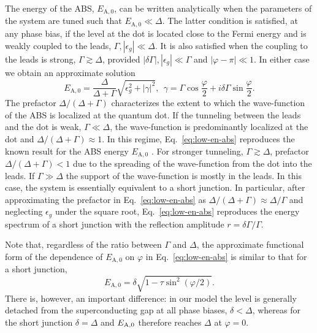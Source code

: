 \documentclass[aps,reprint,longbibliography, prb]{revtex4-2}
\begin{document}
The energy of the ABS, $E_\mathrm{A,0}$, can be written analytically when the parameters of the system are tuned such that $E_{\mathrm{A,0}}\ll \Delta$. The latter condition is satisfied, at any phase bias, if the level at the dot is located close to the Fermi energy and is weakly coupled to the leads, $\Gamma, |\epsilon_g| \ll \Delta$. It is also satisfied when the coupling to the leads is strong, $\Gamma \gtrsim \Delta$, provided $|\delta\Gamma|, |\epsilon_g| \ll \Gamma$ and $|\varphi-\pi|\ll 1$. In either case we obtain an approximate solution
\begin{equation}
    \label{eq:low-en-abs}
    E_\mathrm{A,0} = \frac{\Delta}{\Delta + \Gamma} \sqrt{\epsilon_g^2 + |\gamma|^2},\:\: \gamma = \Gamma \cos\frac{\varphi}{2} + i \delta\Gamma \sin\frac{\varphi}{2}.
\end{equation}
The prefactor $\Delta/(\Delta + \Gamma)$ characterizes the extent to which the wave-function of the ABS is localized at the quantum dot. If the tunneling between the leads and the dot is weak, $\Gamma \ll \Delta$, the wave-function is predominantly localized at the dot and $\Delta/(\Delta + \Gamma) \approx 1$. In this regime, Eq.~\eqref{eq:low-en-abs} reproduces the known result for the ABS energy $E_\mathrm{A,0}$ \cite{wendin1996, devyatov1997}. For stronger tunneling, $\Gamma \gtrsim \Delta$, prefactor $\Delta/(\Delta + \Gamma) < 1$ due to the spreading of the wave-function from the dot into the leads. If $\Gamma \gg \Delta$ the support of the wave-function is mostly in the leads.  In this case, the system is essentially equivalent to a short junction. In particular, after approximating the prefactor in Eq.~\eqref{eq:low-en-abs} as $\Delta/(\Delta+\Gamma) \approx \Delta/\Gamma$ and neglecting $\epsilon_g$ under the square root, Eq.~\eqref{eq:low-en-abs} reproduces the energy spectrum of a short junction \cite{houten1991} with the reflection amplitude $r = \delta\Gamma/\Gamma$.

Note that, regardless of the ratio between $\Gamma$ and $\Delta$, the approximate functional form of the dependence of $E_\mathrm{A,0}$ on $\varphi$ in Eq.~\eqref{eq:low-en-abs} is similar to that for a short junction, 
\begin{equation}
\label{eq:func-form}
E_\mathrm{A,0} = \delta \sqrt{1-\tau \sin^2(\varphi/2)}.
\end{equation}
There is, however, an important difference: in our model the level is generally detached from the superconducting gap at all phase biases, $\delta < \Delta$, whereas for the short junction $\delta = \Delta$ and $E_{\rm A,0}$ therefore reaches $\Delta$ at $\varphi = 0$.
\end{document}
